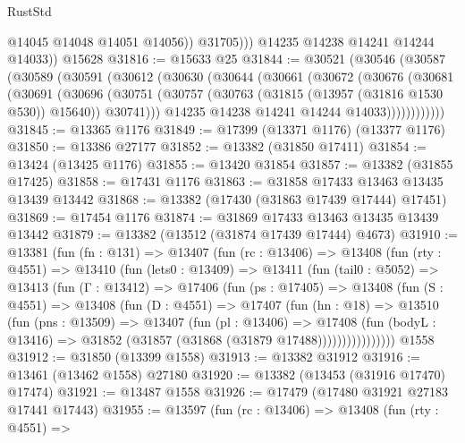 \begin{lexlean}{RustStd}
\begin{coremodule}
                  @14045
                  @14048
                  @14051
                  @14056))
              @31705)))
        @14235
        @14238
        @14241
        @14244
        @14033))
    @15628
@31816 := @15633 @25
@31844 := @30521
    (@30546
      (@30587
        (@30589
          (@30591
            (@30612
              (@30630
                (@30644
                  (@30661
                    (@30672
                      (@30676
                        (@30681
                          (@30691
                            (@30696
                              (@30751
                                (@30757
                                  (@30763 (@31815 (@13957 (@31816 @1530 @530)) @15640))
                                  @30741)))
                            @14235
                            @14238
                            @14241
                            @14244
                            @14033))))))))))))
@31845 := @13365 @1176
@31849 := @17399 (@13371 @1176) (@13377 @1176)
@31850 := @13386 @27177
@31852 := @13382 (@31850 @17411)
@31854 := @13424 (@13425 @1176)
@31855 := @13420 @31854
@31857 := @13382 (@31855 @17425)
@31858 := @17431 @1176
@31863 := @31858 @17433 @13463 @13435 @13439 @13442
@31868 := @13382 (@17430 (@31863 @17439 @17444) @17451)
@31869 := @17454 @1176
@31874 := @31869 @17433 @13463 @13435 @13439 @13442
@31879 := @13382 (@13512 (@31874 @17439 @17444) @4673)
@31910 := @13381
    (fun (fn : @131) =>
    @13407
      (fun (rc : @13406) =>
      @13408
        (fun (rty : @4551) =>
        @13410
          (fun (lets0 : @13409) =>
          @13411
            (fun (tail0 : @5052) =>
            @13413
              (fun (Γ : @13412) =>
              @17406
                (fun (ps : @17405) =>
                @13408
                  (fun (S : @4551) =>
                  @13408
                    (fun (D : @4551) =>
                    @17407
                      (fun (hn : @18) =>
                      @13510
                        (fun (pns : @13509) =>
                        @13407
                          (fun (pl : @13406) =>
                          @17408
                            (fun (bodyL : @13416) =>
                            @31852 (@31857 (@31868 (@31879 @17488))))))))))))))))
    @1558
@31912 := @31850 (@13399 @1558)
@31913 := @13382 @31912
@31916 := @13461 (@13462 @1558) @27180
@31920 := @13382 (@13453 (@31916 @17470) @17474)
@31921 := @13487 @1558
@31926 := @17479 (@17480 @31921 @27183 @17441 @17443)
@31955 := @13597
    (fun (rc : @13406) =>
    @13408
      (fun (rty : @4551) =>

\end{coremodule}
\end{lexlean}
